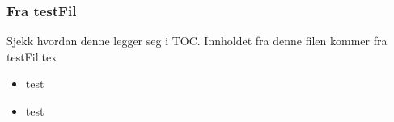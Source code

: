 \subsubsection{Fra testFil}
Sjekk hvordan denne legger seg i TOC. Innholdet fra denne filen kommer fra testFil.tex
\begin{itemize}
	\item test
	\item test
\end{itemize}



